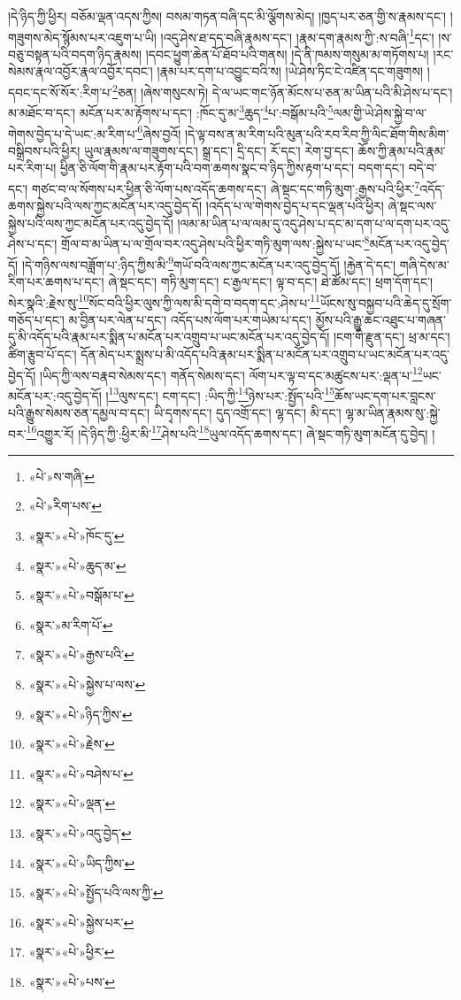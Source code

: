 །དེ་ཉིད་ཀྱི་ཕྱིར། བཅོམ་ལྡན་འདས་ཀྱིས། བསམ་གཏན་བཞི་དང་མི་ལྕོགས་མེད། །ཁྱད་པར་ཅན་གྱི་ས་རྣམས་དང་། །གཟུགས་མེད་སྙོམས་པར་འཇུག་པ་ཡི། །འདུ་ཤེས་ཐ་དད་བཞི་རྣམས་དང་། །རྣམ་དག་རྣམས་ཀྱི་:ས་བཞི་\footnote{«པེ་»ས་གཞི་}དང་། །ས་བཅུ་བསྟན་པའི་བདག་ཉིད་རྣམས། །དབང་ཕྱུག་ཆེན་པོ་ཐོབ་པའི་གནས། །དེ་ནི་ཁམས་གསུམ་མ་གཏོགས་པ། །རང་སེམས་རྣལ་འབྱོར་རྣལ་འབྱོར་དབང་། །རྣམ་པར་དག་པ་འབྱུང་བའི་ས། །ཡེ་ཤེས་ཏིང་ངེ་འཛིན་དང་གཟུགས། །དབང་དང་སོ་སོར་:རིག་པ་\footnote{«པེ་»རིག་པས་}ཅན། །ཞེས་གསུངས་ཏེ། དེ་ལ་ཡང་གང་ཉོན་མོངས་པ་ཅན་མ་ཡིན་པའི་མི་ཤེས་པ་དང་། མ་མཐོང་བ་དང་། མངོན་པར་མ་རྟོགས་པ་དང་། :ཁོང་དུ་མ་\footnote{«སྣར་»«པེ་»ཁོང་དུ་}ཆུད་\footnote{«སྣར་»«པེ་»ཆུད་མ་}པ་:བསྒོམ་པའི་\footnote{«སྣར་»«པེ་»བསྒོམ་པ་}ལམ་གྱི་ཡེ་ཤེས་སྐྱེ་བ་ལ་གེགས་བྱེད་པ་དེ་ཡང་:མ་རིག་པ་\footnote{«སྣར་»མ་རིག་པོ་}ཞེས་བྱའོ། །དེ་ལྟ་བས་ན་མ་རིག་པའི་མུན་པའི་རབ་རིབ་ཀྱི་ལིང་ཐོག་གིས་མིག་བསྒྲིབས་པའི་ཕྱིར། ཡུལ་རྣམས་ལ་གཟུགས་དང་། སྒྲ་དང་། དྲི་དང་། རོ་དང་། རེག་བྱ་དང་། ཆོས་ཀྱི་རྣམ་པའི་རྣམ་པར་རིག་པ། ཕྱིན་ཅི་ལོག་གི་རྣམ་པར་རྟོག་པའི་བག་ཆགས་སྣང་བ་ཉིད་ཀྱིས་རྟག་པ་དང་། བདག་དང་། བདེ་བ་དང་། གཙང་བ་ལ་སོགས་པར་ཕྱིན་ཅི་ལོག་པས་འདོད་ཆགས་དང་། ཞེ་སྡང་དང་གཏི་མུག་:རྒྱས་པའི་ཕྱིར་\footnote{«སྣར་»«པེ་»རྒྱས་པའི་}འདོད་ཆགས་སྐྱེས་པའི་ལས་ཀྱང་མངོན་པར་འདུ་བྱེད་དོ། །འདོད་པ་ལ་གེགས་བྱེད་པ་དང་ལྡན་པའི་ཕྱིར། ཞེ་སྡང་ལས་སྐྱེས་པའི་ལས་ཀྱང་མངོན་པར་འདུ་བྱེད་དོ། །ལམ་མ་ཡིན་པ་ལ་ལམ་དུ་འདུ་ཤེས་པ་དང་མ་དག་པ་ལ་དག་པར་འདུ་ཤེས་པ་དང་། གྲོལ་བ་མ་ཡིན་པ་ལ་གྲོལ་བར་འདུ་ཤེས་པའི་ཕྱིར་གཏི་མུག་ལས་:སྐྱེས་པ་ཡང་\footnote{«སྣར་»«པེ་»སྐྱེས་པ་ལས་}མངོན་པར་འདུ་བྱེད་དོ། །དེ་གཉིས་ལས་བཟློག་པ་:ཉིད་ཀྱིས་མི་\footnote{«སྣར་»«པེ་»ཉིད་ཀྱིས་}གཡོ་བའི་ལས་ཀྱང་མངོན་པར་འདུ་བྱེད་དོ། །རྐྱེན་དེ་དང་། གཞི་དེས་མ་རིག་པར་ཆགས་པ་དང་། ཞེ་སྡང་དང་། གཏི་མུག་དང་། ང་རྒྱལ་དང་། ལྟ་བ་དང་། ཐེ་ཚོམ་དང་། ཕྲག་དོག་དང་། སེར་སྣའི་:རྗེས་སུ་\footnote{«སྣར་»«པེ་»རྗེས་}སོང་བའི་ཕྱིར་ལུས་ཀྱི་ལས་མི་དགེ་བ་བདག་དང་:ཤེས་པ་\footnote{«སྣར་»«པེ་»བཤེས་པ་}ཡོངས་སུ་བསྐྱབ་པའི་ཆེད་དུ་སྲོག་གཅོད་པ་དང་། མ་བྱིན་པར་ལེན་པ་དང་། འདོད་པས་ལོག་པར་གཡེམ་པ་དང་། མྱོས་པའི་རྒྱུ་ཆང་འཐུང་པ་གཞན་དུ་མི་འདོད་པའི་རྣམ་པར་སྨིན་པ་མངོན་པར་འགྲུབ་པ་ཡང་མངོན་པར་འདུ་བྱེད་དོ། །ངག་གི་རྫུན་དང་། ཕྲ་མ་དང་། ཚིག་རྩུབ་པོ་དང་། དོན་མེད་པར་སྨྲས་པ་མི་འདོད་པའི་རྣམ་པར་སྨིན་པ་མངོན་པར་འགྲུབ་པ་ཡང་མངོན་པར་འདུ་བྱེད་དོ། །ཡིད་ཀྱི་ལས་བརྣབ་སེམས་དང་། གནོད་སེམས་དང་། ལོག་པར་ལྟ་བ་དང་མཚུངས་པར་:ལྡན་པ་\footnote{«སྣར་»«པེ་»ལྡན་}ཡང་མངོན་པར་:འདུ་བྱེད་དོ། །\footnote{«སྣར་»«པེ་»འདུ་བྱེད་}ལུས་དང་། ངག་དང་། :ཡིད་ཀྱི་\footnote{«སྣར་»«པེ་»ཡིད་ཀྱིས་}ཉེས་པར་:སྤྱོད་པའི་\footnote{«སྣར་»«པེ་»སྤྱོད་པའི་ལས་ཀྱི་}ཆོས་ཡང་དག་པར་བླངས་པའི་རྒྱུས་སེམས་ཅན་དམྱལ་བ་དང་། ཡི་དྭགས་དང་། དུད་འགྲོ་དང་། ལྷ་དང་། མི་དང་། ལྷ་མ་ཡིན་རྣམས་སུ་:སྐྱེ་བར་\footnote{«སྣར་»«པེ་»སྐྱེས་པར་}འགྱུར་རོ། །དེ་ཉིད་ཀྱི་:ཕྱིར་མི་\footnote{«སྣར་»«པེ་»ཕྱིར་}ཤེས་པའི་\footnote{«སྣར་»«པེ་»པས་}ཡུལ་འདོད་ཆགས་དང་། ཞེ་སྡང་གཏི་མུག་མངོན་དུ་བྱེད། །
